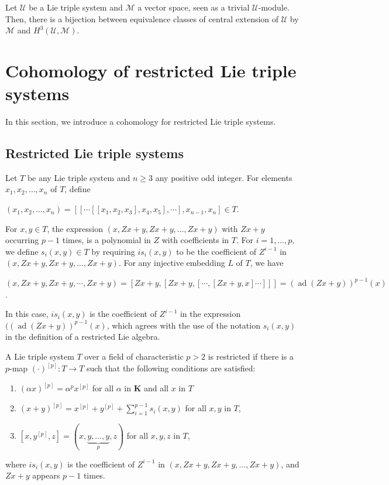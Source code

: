 \documentclass[11pt, twoside]{article}
\DeclareMathOperator{\ad}{ad}
\begin{document}
\begin{thm}
    Let $\mathcal{U}$ be a Lie triple system and $\mathcal{M}$ a vector space, seen as a trivial $\mathcal{U}$-module. Then, there is a bijection between equivalence classes of central extension of $\mathcal{U}$ by $\mathcal{M}$ and $H^3(\mathcal{U},\mathcal{M})$.
\end{thm}

\section{Cohomology of restricted Lie triple systems}\label{s5}
In this section, we introduce a cohomology for restricted Lie triple systems.
\subsection{Restricted Lie triple systems}

Let $T$ be any Lie triple system and $n\geq 3$ any positive odd integer. For elements $x_1,x_2,\dots , x_n $ of $T$, define \begin{center}
    $(x_1,x_2,\dots,x_n)= [[\cdots [[x_1,x_2,x_3],x_4,x_5],\cdots],x_{n-1},x_n] \in T$.
\end{center} For $x,y\in T $, the expression $(x,Zx+y,Zx+y,\dots , Zx+y) $ with $Zx+y$ occurring $p-1$ times, is a polynomial in $Z$ with coefficients in $T$. For $i=1,\dots,p $, we define $s_i(x,y) \in T$ by requiring $is_i(x,y)$ to be the coefficient of $Z^{i-1} $ in $(x,Zx+y,Zx+y,\dots,Zx+y) $. For any injective embedding $L$ of $T$, we have \begin{center}
    $(x,Zx+y,Zx+y,\cdots,Zx+y)= [Zx+y,[Zx+y,[\cdots ,[Zx+y,x]\cdots]]] = (\ad(Zx+y))^{p-1}(x) $.
\end{center} In this case, $is_i(x,y) $ is the coefficient of $Z^{i-1} $ in the expression $((\ad(Zx+y))^{p-1}(x) $, which agrees with the use of the notation $s_i(x,y) $ in the definition of a restricted Lie algebra. 

\begin{defi}\label{D5.1}
    A Lie triple system $T$ over a field of characteristic $p>2$ is restricted if there is a $p$-map $(\cdot)^{[p]}:T\to T $  such that the following conditions are satisfied: \begin{enumerate}        
        \item $(\alpha x)^{[p]}= \alpha^p x^{[p]} $ for all $\alpha$ in $\mathbf{K}$ and all $x$ in $T$
        \item $(x+y)^{[p]}= x^{[p]}+y^{[p]}+ \sum\limits_{i=1}^{p-1}s_i(x,y) $ for all $x,y$ in $T$,
        \item  $[x,y^{[p]},z]=(x,\underbrace{y,\ldots,y}_p,z) $ for all $x,y,z$ in $T$,
    \end{enumerate} where $is_i(x,y)$ is the coefficient of $Z^{i-1} $ in $(x,Zx+y,Zx+y,\dots,Zx+y) $, and $Zx+y $ appears $p-1$ times.
\end{defi}
\end{document}
